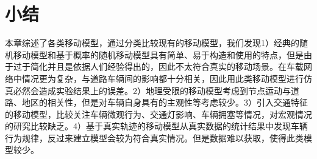 \section{小结}

本章综述了各类移动模型，通过分类比较现有的移动模型，我们发现1）经典的随机移动模型和基于概率的随机移动模型具有简单、易于构造和使用的特点，但是由于过于简化并且是依据人们经验得出的，因此不太符合真实的移动场景。在车载网络中情况更为复杂，与道路车辆间的影响都十分相关，因此用此类移动模型进行仿真必然会造成实验结果上的误差。2）地理受限的移动模型考虑到节点运动与道路、地区的相关性，但是对车辆自身具有的主观性等考虑较少。3）引入交通特征的移动模型，比较关注车辆微观行为、交通灯影响、车辆拥塞等情况，对宏观情况的研究比较缺乏。4）基于真实轨迹的移动模型从真实数据的统计结果中发现车辆行为规律，反过来建立模型会较为符合真实情况。但是数据难以获取，使得此类模型较少。
